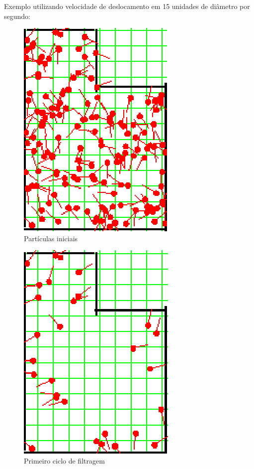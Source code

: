 Exemplo utilizando velocidade de deslocamento em 15 unidades de diâmetro por segundo:

\begin{figure}[H]
  \centering
  \includegraphics[scale=1]{figuras/cen3_ex4/1.eps}
  \caption[Partículas Iniciais]{Partículas iniciais}
  \label{img:cen3_ex4_1}
\end{figure}

\begin{figure}[H]
  \centering
  \includegraphics[scale=1]{figuras/cen3_ex4/2.eps}
  \caption[Primeiro Ciclo de Filtragem]{Primeiro ciclo de filtragem}
  \label{img:cen3_ex4_2}
\end{figure}

